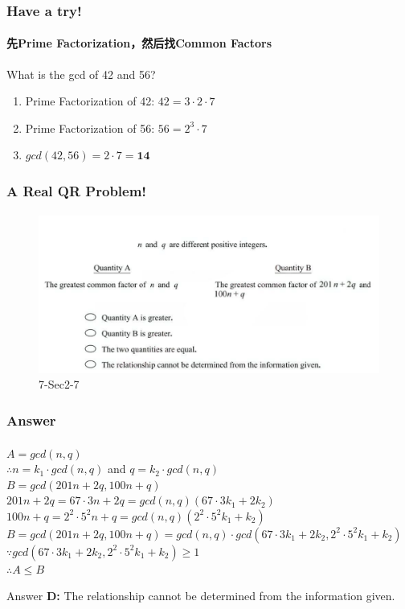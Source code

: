\documentclass[
	11pt, %
]{beamer}
\begin{document}

\begin{frame}
	\frametitle{Have a try!}
	\framesubtitle{先Prime Factorization，然后找Common Factors}
		What is the gcd of 42 and 56?
		 \pause
		 \begin{enumerate}
		 	\item Prime Factorization of 42: $42=3 \cdot 2 \cdot 7$ \pause
		 	\item Prime Factorization of 56: $56=2^3 \cdot 7$ \pause
		 	\item  $gcd(42, 56) = 2 \cdot 7 = \textbf{14}$ 
		 	\end{enumerate}
\end{frame}



\begin{frame}
	\frametitle{A Real QR Problem!}
	\framesubtitle{}
	\begin{figure}
		\includegraphics[width=\linewidth]{GCD_Example_Question.png}
		\caption{7-Sec2-7}
	\end{figure}
\bigskip

\end{frame}



\begin{frame}
	\frametitle{Answer}
	\framesubtitle{}
	$A = gcd(n, q)$ \\
	$\therefore n = k_1 \cdot gcd(n, q)$ and $q = k_2 \cdot gcd(n, q)$\\
	\bigskip
  $B = gcd(201n + 2q, 100n + q)$ \\
	$201n + 2q = 67 \cdot 3 n + 2q = gcd(n, q) ( 67 \cdot 3 k_1 + 2k_2)$
	$100n + q = 2^2\cdot5^2n + q = gcd(n, q) ( 2^2\cdot5^2k_1 + k_2)$
	\bigskip
	$B = gcd(201n + 2q, 100n + q)=gcd(n,q) \cdot gcd(67 \cdot 3 k_1 + 2k_2, 2^2\cdot5^2k_1 + k_2)$ \\
	$\because gcd(67 \cdot 3 k_1 + 2k_2, 2^2\cdot5^2k_1 + k_2) \geq 1$ \\
	$\therefore A \leq B$

\bigskip
\pause
Answer \textbf{D: } The relationship cannot be determined from the information given.
\end{frame}
\end{document}
